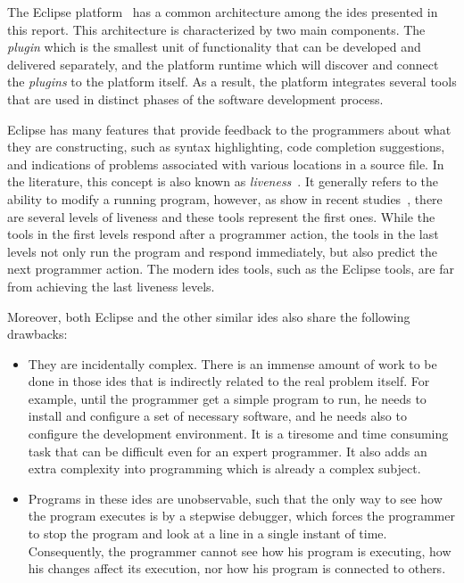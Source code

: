The Eclipse platform~\cite{DesRivieres2004} has a common architecture among the \ac{ide}s presented in this report. This architecture is characterized by two main components. The \textit{plugin} which is the smallest unit of functionality that can be developed and delivered separately, and the platform runtime which will discover and connect the \textit{plugins} to the platform itself. As a result, the platform integrates several tools that are used in distinct phases of the software development process.

Eclipse has many features that provide feedback to the programmers about what they are constructing, such as syntax highlighting, code completion suggestions, and indications of problems associated with various locations in a source file. In the literature, this concept is also known as \textit{liveness}~\cite{alpern1985defining}. It generally refers to the ability to modify a running program, however, as show in recent studies~\cite{tanimoto2013perspective}, there are several levels of liveness and these tools represent the first ones. While the tools in the first levels respond after a programmer action, the tools in the last levels not only run the program and respond immediately, but also predict the next programmer action. The modern \ac{ide}s tools, such as the Eclipse tools, are far from achieving the last liveness levels.

Moreover, both Eclipse and the other similar \ac{ide}s also share the following drawbacks:
\begin{itemize}
	\item They are incidentally complex. There is an immense amount of work to be done in those \ac{ide}s that is indirectly related to the real problem itself. For example, until the programmer get a simple program to run, he needs to install and configure a set of necessary software, and he needs also to configure the development environment. It is a tiresome and time consuming task that can be difficult even for an expert programmer. It also adds an extra complexity into programming which is already a complex subject.

	\item Programs in these \ac{ide}s are unobservable, such that the only way to see how the program executes is by a stepwise debugger, which forces the programmer to stop the program and look at a line in a single instant of time. Consequently, the programmer cannot see how his program is executing, how his changes affect its execution, nor how his program is connected to others.
\end{itemize}
